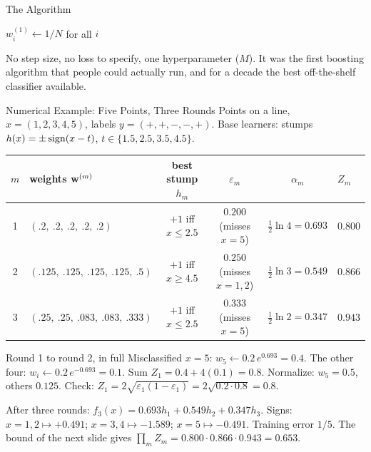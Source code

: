 \documentclass[11pt,aspectratio=169]{beamer}
\begin{document}
\begin{frame}{The Algorithm}
\begin{algorithm}[H]
\SetAlgoLined
$w_i^{(1)}\gets1/N$ for all $i$\;
\end{algorithm}
\vspace{4pt}
No step size, no loss to specify, one hyperparameter ($M$). It was the first boosting algorithm that people
could actually run, and for a decade the best off-the-shelf classifier available.
\end{frame}

\begin{frame}{Numerical Example: Five Points, Three Rounds}\footnotesize
Points on a line, $x=(1,2,3,4,5)$, labels $y=(+,+,-,-,+)$. Base learners: stumps $h(x)=\pm\operatorname{sign}(x-t)$, $t\in\{1.5,2.5,3.5,4.5\}$.
\begin{center}
\begin{tabular}{clcccl}
\toprule
$m$ & weights $\mathbf{w}^{(m)}$ & best stump $h_m$ & $\varepsilon_m$ & $\alpha_m$ & $Z_m$ \\
\midrule
1 & $(.2,\ .2,\ .2,\ .2,\ .2)$ & $+1$ iff $x\le2.5$ & $0.200$ (misses $x{=}5$) & $\tfrac12\ln4=0.693$ & $0.800$ \\[2pt]
2 & $(.125,\ .125,\ .125,\ .125,\ .5)$ & $+1$ iff $x\ge4.5$ & $0.250$ (misses $x{=}1,2$) & $\tfrac12\ln3=0.549$ & $0.866$ \\[2pt]
3 & $(.25,\ .25,\ .083,\ .083,\ .333)$ & $+1$ iff $x\le2.5$ & $0.333$ (misses $x{=}5$) & $\tfrac12\ln2=0.347$ & $0.943$ \\
\bottomrule
\end{tabular}
\end{center}
\begin{derivation}{Round 1 to round 2, in full}
Misclassified $x{=}5$: $w_5\gets0.2\,e^{0.693}=0.4$. The other four: $w_i\gets0.2\,e^{-0.693}=0.1$.
Sum $Z_1=0.4+4(0.1)=0.8$. Normalize: $w_5=0.5$, others $0.125$.
Check: $Z_1=2\sqrt{\varepsilon_1(1-\varepsilon_1)}=2\sqrt{0.2\cdot0.8}=0.8$. \checkmark
\end{derivation}
After three rounds: $f_3(x)=0.693h_1+0.549h_2+0.347h_3$. Signs: $x{=}1,2\mapsto+0.491$; $x{=}3,4\mapsto-1.589$;
$x{=}5\mapsto-0.491$. Training error $1/5$. The bound of the next slide gives $\prod_mZ_m=0.800\cdot0.866\cdot0.943=0.653$.
\end{frame}
\end{document}
